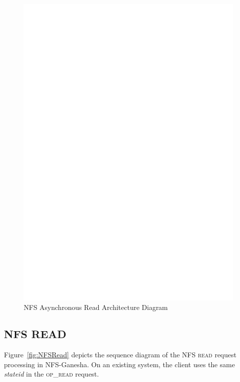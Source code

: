 \begin{figure}
\centering
\includegraphics[scale=0.7]{figures/AsyncRead.eps}
\caption{NFS Asynchronous Read Architecture Diagram}
\label{fig:NFSAsyncReadArch}
\end{figure}

\subsection{NFS READ}

Figure~\ref{fig:NFSRead} depicts the sequence diagram of the \textsc{NFS read} request processing in NFS-Ganesha. On an existing system, the client uses the same \textit{stateid} in the \textsc{op\_read} request. 

